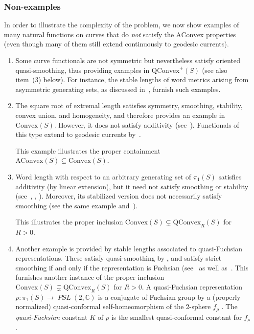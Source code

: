 \documentclass[11pt]{amsart}
\numberwithin{equation}{section}
\numberwithin{figure}{section}
\theoremstyle{definition}
\theoremstyle{plain}
\DeclareMathOperator{\PSL}{\mathit{PSL}}
\newcommand{\AConvex}{\mathrm{AConvex}}
\newcommand{\Convex}{\mathrm{Convex}}
\newcommand{\QConvex}{\mathrm{QConvex}}
\begin{document}
\subsubsection{Non-examples}

In order to illustrate the complexity of the problem,
we now show examples of many natural functions on curves that do \emph{not} satisfy the $\AConvex$ properties (even though many of them still extend continuously to geodesic currents).

\begin{enumerate}
    \item Some curve functionals are not symmetric but nevertheless satisfy
oriented quasi-smoothing, thus providing examples in
$\QConvex^+(S)$ (see also item~(3) below). For instance, the stable
lengths of word metrics arising from asymmetric generating sets,
as discussed in~\cite[Section~4.6]{MGT21:Smoothings}, furnish such
examples.
    \item The square root of extremal length satisfies symmetry, smoothing,
stability, convex union, and homogeneity, and therefore provides an
example in $\Convex(S)$. However, it does not satisfy additivity
(see~\cite[Section~4.8]{MGT21:Smoothings}). Functionals of this type
extend to geodesic currents by~\cite[Theorem~A]{MGT21:Smoothings}.

This example illustrates the proper containment $\AConvex(S) \subsetneq \Convex(S).$
    \item Word length with respect to an arbitrary generating set of $\pi_1(S)$
satisfies additivity (by linear extension), but it need not satisfy
smoothing or stability (see~\cite[Example~4.10]{MGT21:Smoothings},
\cite[Theorem~1.5]{EPS20:CountingCurves},
\cite{Erlandsson:WordLength}). 
Moreover, its stabilized version does not necessarily satisfy smoothing
(see the same example and~\cite[Theorem~B]{MGT21:Smoothings}).

This illustrates the proper inclusion $\Convex(S) \subsetneq \QConvex_R(S)$ for $R>0$.
    \item Another example is provided by stable lengths associated to
quasi-Fuchsian representations. These satisfy quasi-smoothing by
\cite[Proposition~4.11]{MGT21:Smoothings}, and satisfy strict
smoothing if and only if the representation is Fuchsian
(see~\cite[Theorem~A]{FF22:QF} as well as~\cite[Proposition~1.8]{BR24:Cubulations}. This furnishes another instance of the
proper inclusion $\Convex(S) \subsetneq \QConvex_R(S)$ for $R>0$.
A quasi-Fuchsian representation $\rho \colon \pi_1(S) \to
\PSL(2,\mathbb{C})$ is a
conjugate of Fuchsian group by a (properly normalized) quasi-conformal
self-homeomorphism of the 2-sphere $f_{\rho}$
\cite[Definition~6.12.2]{Hub06:Vol1}. The
\emph{quasi-Fuchsian} constant $K$ of $\rho$ is the smallest quasi-conformal
constant for $f_{\rho}$.


\end{enumerate}
\end{document}
